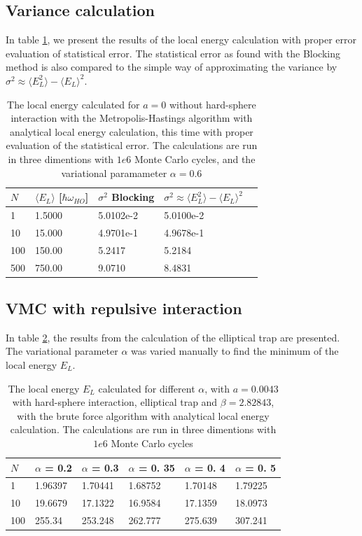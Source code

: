 \documentclass[norsk,a4paper,12pt]{article}
\begin{document}
 \subsection{Variance calculation}

In table \ref{tab:variance_analysis}, we present the results of the local energy calculation with proper error evaluation of statistical error. The statistical error as found with the Blocking method is also compared to the simple way of approximating the variance by $\sigma^2 \approx \langle E_L^2 \rangle - \langle E_L \rangle^2$. 

\begin{table} [H]
	\caption{The local energy calculated for $a=0$  without hard-sphere interaction with the Metropolis-Hastings algorithm with analytical local energy calculation, this time with proper evaluation of the statistical error.  The calculations are run in three dimentions with $1e6$ Monte Carlo cycles, and the variational paramameter $\alpha=0.6$}
	\begin{tabularx}{\textwidth}{X|XXXX} \hline
		\label{tab:variance_analysis}
		$N$ & $\langle E_L\rangle$ [$\hbar\omega_{HO}$] & $\sigma^2$ Blocking & $\sigma^2 \approx \langle E_L^2 \rangle - \langle E_L \rangle^2$ \\ \hline
				1 & 1.5000 & 5.0102e-2  & 5.0100e-2 \\
				10 & 15.000 & 4.9701e-1 & 4.9678e-1  \\
				100 & 150.00 & 5.2417 & 5.2184\\
				500 & 750.00 & 9.0710 & 8.4831 \\ \hline
	\end{tabularx}
\end{table}

\subsection{VMC with repulsive interaction}
In table \ref{tab:EL_calc_repulsive_pot}, the results from the calculation of the elliptical trap are presented. The variational parameter $\alpha$ was varied manually to find the minimum of the local energy $E_L$.

\begin{table} [H]
	\centering
	\caption{The local energy $E_L$ calculated for different $\alpha$, with $a=0.0043$  with hard-sphere interaction,  elliptical trap and $\beta=2.82843$, with the brute force algorithm with analytical local energy calculation.  The calculations are run in three dimentions with $1e6$ Monte Carlo cycles}
	\begin{tabularx}{\textwidth}{X|XXXXX} \hline
		\label{tab:EL_calc_repulsive_pot}
		$N$ & $\alpha$ = 0.2 & $\alpha$ = 0.3  & $\alpha$ = 0. 35 & $\alpha$ = 0. 4 & $\alpha$ = 0. 5   \\ \hline
		1 & 1.96397 & 1.70441  & 1.68752 & 1.70148 & 1.79225\\
		10 & 19.6679 & 17.1322 & 16.9584 &17.1359 & 18.0973\\
		100 & 255.34 & 253.248 & 262.777 & 275.639 & 307.241\\ \hline
	\end{tabularx}
\end{table}
\end{document}
